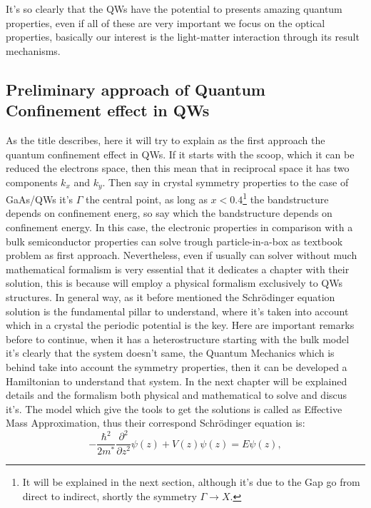 It's so clearly  that the QWs have the potential to presents amazing quantum properties, even if all of these are very important we focus on the optical properties, basically our interest is the light-matter interaction through its result mechanisms.  
 
\subsection{Preliminary approach of Quantum Confinement effect in QWs}
\label{subsection:chapter-1-preliminary-approach-of-quantum-confinment-effect-in-qws}
\vspace{-10mm} 
As the title describes, here it will try to explain as the first  approach the quantum confinement effect in QWs. If  it starts with the  scoop, which it can be reduced the electrons space, then this mean that in reciprocal space it has two components $k_{x}$ and $k_{y}$. Then say in crystal symmetry properties to the case of GaAs/\algaas QWs it's $\Gamma$ the central point, as long as $x < 0.4$\footnote{It will be explained in the next section, although it's due to the Gap go from direct to indirect, shortly the symmetry $\Gamma\to X$.} the bandstructure depends on confinement energ, so say which the bandstructure depends on confinement energy.  
In this case, the electronic properties in comparison with a bulk semiconductor properties can solve trough particle-in-a-box as textbook problem as first approach. Nevertheless, even if usually can solver without much mathematical formalism is very essential that it dedicates a chapter with their solution, this is because will employ a physical formalism exclusively to QWs structures. In general way, as it before mentioned the Schrödinger equation solution is the fundamental pillar to understand, where it's taken into account which  in a crystal the periodic potential is the key. Here are important remarks before to continue, when it has a heterostructure starting with the bulk model it's clearly that the system doesn't same, the Quantum Mechanics which is behind take into account the symmetry properties, then it can be developed a Hamiltonian  to understand that system.  In the next chapter will be explained details and the formalism both physical and mathematical to solve and discus it's. The model which give the tools to get the solutions is called as Effective Mass Approximation, thus their correspond Schrödinger equation is\cite{harrison2016quantum,chuang1995physics,singh2003electronic,bastard1990wave,fox2002optical,davies1998physics}: 
\begin{equation}\label{eq:chapter-1-ema-schroedinger}
	-\dfrac{\hbar^{2}}{2m^{*}}\dfrac{\partial^{2}}{\partial {z}^{2}}\psi(z)+V(z)\psi(z)=E\psi(z),
\end{equation}

